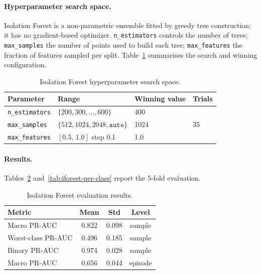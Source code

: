 \paragraph{Hyperparameter search space.}
Isolation Forest is a non-parametric ensemble fitted by greedy tree construction; it has no gradient-based optimizer. \texttt{n\_estimators} controls the number of trees; \texttt{max\_samples} the number of points used to build each tree; \texttt{max\_features} the fraction of features sampled per split. Table~\ref{tab:iforest-hpo} summarises the search and winning configuration.
\begin{table}[H]
\centering
\caption{Isolation Forest hyperparameter search space.\label{tab:iforest-hpo}}
\begin{tabular}{llll}
\toprule
\textbf{Parameter} & \textbf{Range} & \textbf{Winning value} & \textbf{Trials} \\
\midrule
\texttt{n\_estimators} & $\{200,300,\ldots,600\}$         & 400  & \multirow{3}{*}{35} \\
\texttt{max\_samples}  & $\{512,1024,2048,\texttt{auto}\}$ & 1024 & \\
\texttt{max\_features} & $[0.5,\,1.0]$ step 0.1           & 1.0  & \\
\bottomrule
\end{tabular}
\end{table}

\paragraph{Results.}
Tables~\ref{tab:iforest-results} and~\ref{tab:iforest-per-class} report the 5-fold evaluation.

\begin{table}[H]
\centering
\caption{Isolation Forest evaluation results.\label{tab:iforest-results}}
\begin{tabular}{lccc}
\toprule
\textbf{Metric} & \textbf{Mean} & \textbf{Std} & \textbf{Level} \\
\midrule
Macro PR-AUC & 0.822 & 0.098 & sample \\
Worst-class PR-AUC     & 0.496 & 0.185 & sample \\
Binary PR-AUC          & 0.974 & 0.028 & sample \\
Macro PR-AUC & 0.656 & 0.044 & episode \\
\bottomrule
\end{tabular}
\end{table}

